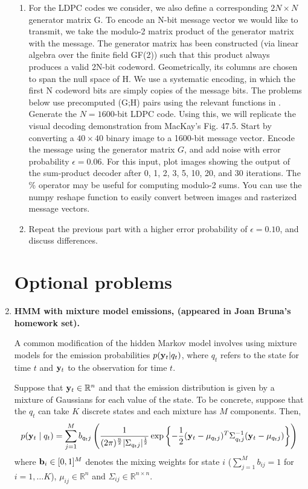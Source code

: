 \documentclass{article}
\newcommand{\yy}{{\bf y}}
\newcommand{\real}{\ensuremath{\mathbb{R}}}
\begin{document}
\begin{enumerate}
\begin{enumerate}
\item For the LDPC codes we consider, we also define a corresponding $2N\times N$ generator matrix G. To encode an N-bit message vector we would like to transmit, we take the modulo-2 matrix product of the generator matrix with the message. The generator matrix has been constructed (via linear algebra over the  finite field GF(2)) such that this product always produces a valid 2N-bit codeword. Geometrically, its columns are chosen to span the null space of H. We use a systematic encoding, in which the first N codeword bits are simply copies of the message bits. The problems below use precomputed (G;H) pairs using the relevant functions in  . Generate the $N = 1600$-bit LDPC code. Using this, we will replicate the visual decoding demonstration from MacKay's Fig. 47.5. Start by converting a $40\times 40$ binary image to a 1600-bit message vector. Encode the message using the  generator matrix $G$,
and add noise with error probability $\epsilon = 0.06$. For this input, plot images showing the output of the sum-product decoder after 0, 1, 2, 3, 5, 10, 20, and 30 iterations. The \%
operator may be useful for computing modulo-2 sums. You can use the numpy reshape function to easily convert between images and rasterized message vectors.
\item Repeat the previous part with a higher error probability of $\epsilon =0.10$, and discuss differences.
\end{enumerate}

\section*{Optional problems}

\item {\bf HMM with mixture model emissions, (appeared in Joan Bruna's homework set). }

A common modification of the hidden Markov model involves using mixture models for the
emission probabilities $p(\yy_t | q_t)$, where $q_t$ refers to the state for time $t$ and $\yy_t$ to the observation for time $t$.

Suppose that ${\bf y}_t \in \real^n$ and that the emission distribution is given by a mixture of Gaussians for each value of the state. To be concrete, suppose that the $q_t$ can take $K$ discrete states and each mixture has $M$ components. Then,
\[
p({\bf y}_t \mid q_t) = \sum_{j=1}^M b_{q_t j}
\left(\frac{1}{(2\pi)^{\frac{n}{2}}|\Sigma_{q_t j}|^{\frac{1}{2}}}
\exp\left\{-\frac{1}{2}({\bf y}_t-\mu_{q_t j})^T\Sigma_{q_t j}^{-1}({\bf y}_t-\mu_{q_t j})
\right\}\right)
\]
where ${\bf b}_i \in [0,1]^M$ denotes the mixing weights for state $i$ ($\sum_{j=1}^M b_{ij} = 1$ for $i=1,\ldots K$), $\mu_{ij} \in  \real^n$ and $\Sigma_{ij} \in  \real^{n\times n}$.


\end{enumerate}
\end{document}
